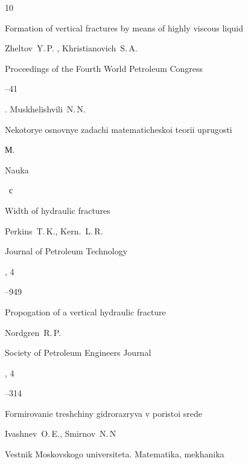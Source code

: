 \begin{thebibliography}{10}





\paper Formation of vertical fractures by means of highly viscous liquid

\by   Zheltov~Y.\,P. , Khristianovich~S.\,A.

\jour Proceedings of the Fourth World Petroleum Congress



--41




.	Muskhelishvili~N.\,N. 

\book Nekotorye osnovnye zadachi matematicheskoi teorii uprugosti

\publaddr М.

\publ Nauka


~с




\paper Width of hydraulic fractures 

\by   Perkins~T.\,K., Kern.~L.\,R.

\jour Journal of Petroleum Technology


, 4

--949




\paper Propogation of a vertical hydraulic fracture

\by   Nordgren~R.\,P.

\jour Society of Petroleum Engineers Journal


, 4

--314




\paper Formirovanie treshchiny gidrorazryva v poristoi srede 

\by   	Ivashnev~O.\,E., Smirnov~N.\,N

\jour Vestnik Moskovskogo universiteta. Matematika, mekhanika


\end{thebibliography}

